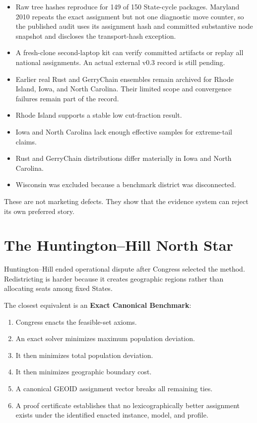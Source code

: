 \documentclass[11pt,twocolumn]{article}
\begin{document}
\begin{itemize}[leftmargin=*,nosep]
State- and district-weighted summaries place CD118 above NRS on Polsby--Popper,
exact Reock, and convex-hull ratio and below NRS on Schwartzberg. This is not
original enacted linework and does not identify a fairer, better, or legally
preferred plan.
\item Raw tree hashes reproduce for 149 of 150 State-cycle packages. Maryland
2010 repeats the exact assignment but not one diagnostic move counter, so the
published audit uses its assignment hash and committed substantive node
snapshot and discloses the transport-hash exception.
\item A fresh-clone second-laptop kit can verify committed artifacts or replay
all national assignments. An actual external v0.3 record is still pending.
\item Earlier real Rust and GerryChain ensembles remain archived for Rhode
Island, Iowa, and North Carolina. Their limited scope and convergence failures
remain part of the record.
\item Rhode Island supports a stable low cut-fraction result.
\item Iowa and North Carolina lack enough effective samples for extreme-tail
claims.
\item Rust and GerryChain distributions differ materially in Iowa and North
Carolina.
\item Wisconsin was excluded because a benchmark district was disconnected.
\end{itemize}

These are not marketing defects. They show that the evidence system can reject
its own preferred story.

\section*{The Huntington--Hill North Star}

Huntington--Hill ended operational dispute after Congress selected the method.
Redistricting is harder because it creates geographic regions rather than
allocating seats among fixed States.

The closest equivalent is an \textbf{Exact Canonical Benchmark}:

\begin{enumerate}[leftmargin=*,nosep]
\item Congress enacts the feasible-set axioms.
\item An exact solver minimizes maximum population deviation.
\item It then minimizes total population deviation.
\item It then minimizes geographic boundary cost.
\item A canonical GEOID assignment vector breaks all remaining ties.
\item A proof certificate establishes that no lexicographically better
assignment exists under the identified enacted instance, model, and profile.
\end{enumerate}
\end{document}
